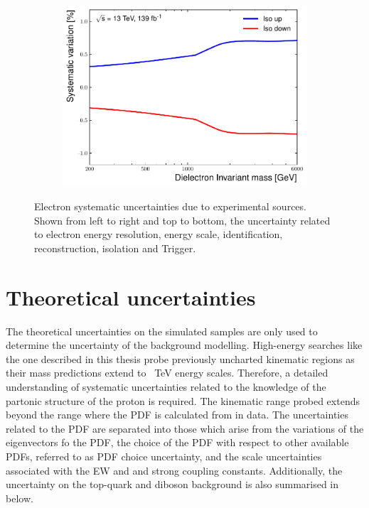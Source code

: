 \begin{figure}[]
\begin{subfigure}[b]{0.42\textwidth}
        \includegraphics[width=\textwidth]{figures/analysis/datamc/Uncertainties/exp/ee/m_ee_pstOR_EL_EFF_Iso_TOTAL_1NPCOR_PLUS_UNCOR__1up.pdf}
        \label{fig:uncert:eeIso}
    \end{subfigure}
    \caption[Electron systematic uncertainties due to experimental sources]{Electron systematic uncertainties due to experimental sources. Shown from left to right and top to bottom, the uncertainty related to electron energy resolution, energy scale, identification, reconstruction, isolation and Trigger.}
    \label{fig:uncert:eeExp}
\end{figure}

\section{Theoretical uncertainties}\label{sec:sysmc:theory}
The theoretical uncertainties on the simulated samples are only used to determine the uncertainty of the background modelling. High-energy searches like the one described in this thesis probe previously uncharted kinematic regions as their mass predictions extend to \SI{}{\tera\electronvolt} energy scales. Therefore, a detailed understanding of systematic uncertainties related to the knowledge of the partonic structure of the proton is required. The kinematic range probed extends beyond the range where the PDF is calculated from in data. The uncertainties related to the PDF are separated into those which arise from the variations of the eigenvectors fo the PDF, the choice of the PDF with respect to other available PDFs, referred to as PDF choice uncertainty, and the scale uncertainties associated with the EW and and strong coupling constants. Additionally, the uncertainty on the top-quark and diboson background is also summarised in below. 

